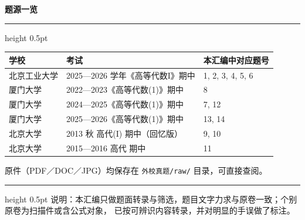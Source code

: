 ﻿\documentclass[11pt,a4paper,fontset=windows]{ctexart}
\newcommand{\grp}[1]{\Needspace{9\baselineskip}\par\vspace{14pt}%
  {\large\bfseries\songti #1}\par\vspace{2pt}\hrule height 0.5pt\par\vspace{6pt}}
\begin{document}
\vspace{12pt}
\grp{题源一览}

{\small\songti
\begin{center}
\renewcommand{\arraystretch}{1.35}
\begin{tabular}{@{}p{4.6cm}p{4.2cm}p{5.6cm}@{}}
\textbf{学校} & \textbf{考试} & \textbf{本汇编中对应题号}\\
\hline
北京工业大学 & 2025—2026 学年《高等代数I》期中 & 1, 2, 3, 4, 5, 6\\
厦门大学 & 2022—2023《高等代数(1)》期中 & 8\\
厦门大学 & 2024—2025《高等代数(1)》期中 & 7, 12\\
厦门大学 & 2025—2026《高等代数(1)》期中 & 13, 14\\
北京大学 & 2013 秋 高代(I) 期中（回忆版） & 9, 10\\
北京大学 & 2015—2016 高代 期中 & 11\\
\end{tabular}
\end{center}

\smallskip
原件（PDF／DOC／JPG）均保存在 \texttt{外校真题/raw/} 目录，可直接查阅。
}
\vspace{4pt}
\hrule height 0.5pt
\vspace{4pt}
{\small\color{hdgray}\songti 说明：本汇编只做题面转录与筛选，题目文字力求与原卷一致；个别原卷为扫描件或含公式对象，
已按可辨识内容转录，并对明显的手误做了标注。}
\end{document}

